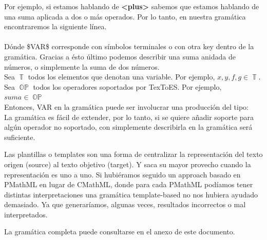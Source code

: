 Por ejemplo, si estamos hablando de \textbf{<plus>} sabemos que estamos hablando de una suma aplicada a dos o más operados. Por lo tanto, en nuestra gramática encontraremos la siguiente línea.\\

\\

Dónde \$VAR\$ corresponde con símbolos terminales o con otra key dentro de la gramática. Gracias a ésto último podemos describir una suma anidada de números, o simplemente la suma de dos números.\\
Sea $\operatorname{\mathbb{T}}$ todos los elementos que denotan una variable. Por ejemplo, $x,y,f,g \in \operatorname{\mathbb{T}}$.\\
Sea $\operatorname{\mathbb{OP}}$ todos los operadores soportados por TexToES. Por ejemplo, $\textit{suma} \in \operatorname{\mathbb{OP}}$\\

Entonces, VAR en la gramática puede ser involucrar una producción del tipo:
\\

La gramática es fácil de extender, por lo tanto, si se quiere añadir soporte para algún operador no soportado, con simplemente describirla en la gramática será suficiente.

Las plantillas o templates son una forma de centralizar la representación del texto origen (source) al texto objetivo (target). Y saca su mayor provecho cuando la representación es uno a uno. Si hubiéramos seguido un approach basado en PMathML en lugar de CMathML, donde para cada PMathML podíamos tener distintas interpretaciones una gramática template-based no nos hubiera ayudado demasiado. Ya que generaríamos, algunas veces, resultados incorrectos o mal interpretados.

La gramática completa puede consultarse en el anexo de este documento.
